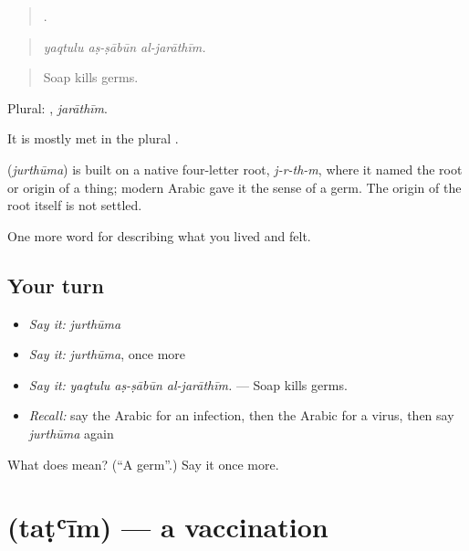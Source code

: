 \begin{quote}
  .
\end{quote}

\begin{quote}
\emph{yaqtulu aṣ-ṣābūn al-jarāthīm.}
\end{quote}

\begin{quote}
Soap kills germs.
\end{quote}

Plural: , \emph{jarāthīm}.

It is mostly met in the plural .

\begin{cousinweb}
\textbf{} (\emph{jurthūma}) is built on a native four-letter root, \emph{j-r-th-m}, where it named the root or origin of a thing; modern Arabic gave it the sense of a germ. The origin of the root itself is not settled.
\end{cousinweb}

\begin{grammarlens}[title={What you've built}]
One more word for describing what you lived and felt.
\end{grammarlens}

\subsection*{Your turn}
\begin{itemize}
\raggedright
  \item \emph{Say it:} \emph{jurthūma}
  \item \emph{Say it:} \emph{jurthūma}, once more
  \item \emph{Say it:} \emph{yaqtulu aṣ-ṣābūn al-jarāthīm.} — Soap kills germs.
  \item \emph{Recall:} say the Arabic for an infection, then the Arabic for a virus, then say \emph{jurthūma} again
\end{itemize}

\begin{tcolorbox}[breakable,colback=teal!4,colframe=teal!35!black,title={Before you move on}]
What does  mean? (\textquotedblleft{}A germ\textquotedblright{}.) Say it once more.
\end{tcolorbox}
\section[\texorpdfstring{\ar{تطعيم} (taṭʿīm)}{تطعيم (taṭʿīm)}]{ (taṭʿīm) — a vaccination}

